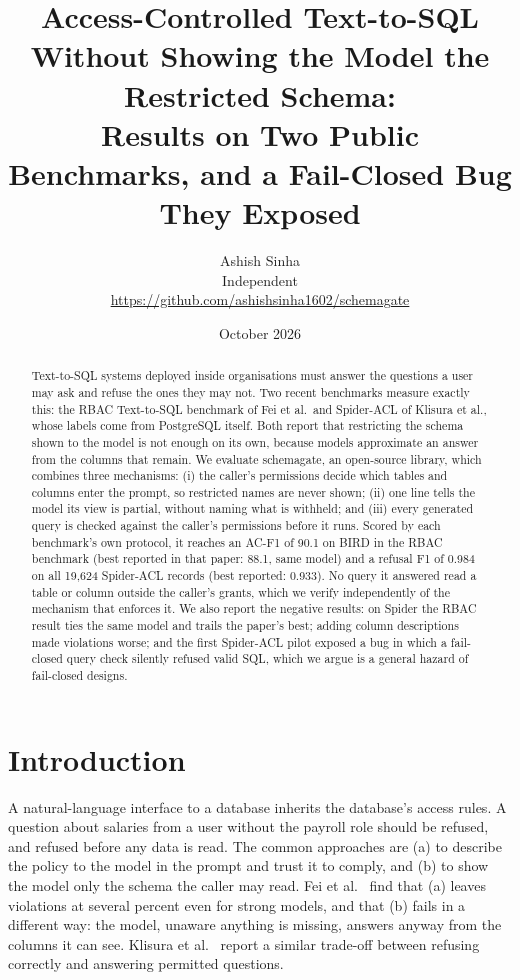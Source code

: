 \documentclass[11pt]{article}
\title{Access-Controlled Text-to-SQL Without Showing the Model the Restricted Schema:\\
Results on Two Public Benchmarks, and a Fail-Closed Bug They Exposed}
\author{Ashish Sinha\\ \small Independent \\ \small \url{https://github.com/ashishsinha1602/schemagate}}
\date{October 2026}
\begin{document}
\maketitle

\begin{abstract}
Text-to-SQL systems deployed inside organisations must answer the questions a user may ask and refuse
the ones they may not. Two recent benchmarks measure exactly this: the RBAC Text-to-SQL benchmark of
Fei et al.\ and Spider-ACL of Klisura et al., whose labels come from PostgreSQL itself. Both report that
restricting the schema shown to the model is not enough on its own, because models approximate an
answer from the columns that remain. We evaluate schemagate, an open-source library, which combines
three mechanisms: (i) the caller's permissions decide which tables and columns enter the prompt, so
restricted names are never shown; (ii) one line tells the model its view is partial, without naming
what is withheld; and (iii) every generated query is checked against the caller's permissions before
it runs. Scored by each benchmark's own protocol, it reaches an AC-F1 of 90.1 on BIRD in the RBAC
benchmark (best reported in that paper: 88.1, same model) and a refusal F1 of 0.984 on all 19,624
Spider-ACL records (best reported: 0.933). No query it answered read a table or column outside the
caller's grants, which we verify independently of the mechanism that enforces it. We also report the
negative results: on Spider the RBAC result ties the same model and trails the paper's best; adding
column descriptions made violations worse; and the first Spider-ACL pilot exposed a bug in which a
fail-closed query check silently refused valid SQL, which we argue is a general hazard of
fail-closed designs.
\end{abstract}

\section{Introduction}
A natural-language interface to a database inherits the database's access rules. A question about
salaries from a user without the payroll role should be refused, and refused before any data is read.
The common approaches are (a) to describe the policy to the model in the prompt and trust it to comply,
and (b) to show the model only the schema the caller may read. Fei et al.~\cite{fei2027rbac} find that
(a) leaves violations at several percent even for strong models, and that (b) fails in a different way:
the model, unaware anything is missing, answers anyway from the columns it can see. Klisura
et al.~\cite{klisura2026acl} report a similar trade-off between refusing correctly and answering
permitted questions.
\end{document}
